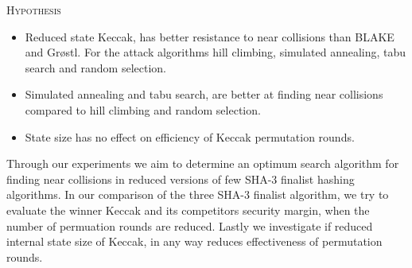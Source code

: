 \begin{center}
  \framebox
  {
    \parbox{400pt}
    {
      \centering \textsc{Hypothesis} \\
      \begin{itemize}
      \item Reduced state Keccak, has better resistance to near collisions than BLAKE and Gr{\o}stl. For the
      attack algorithms hill climbing, simulated annealing, tabu search and random selection.
      \item Simulated annealing and tabu search, are better at finding near collisions compared to hill 
      climbing and random selection.
      \item State size has no effect on efficiency of Keccak permutation rounds.
      \end{itemize}
    }
  }
\end{center}

Through our experiments we aim to determine an optimum search algorithm for finding near collisions
in reduced versions of few SHA-3 finalist hashing algorithms. In our comparison of
the three SHA-3 finalist algorithm, we try to evaluate the winner Keccak and its competitors security margin, when
the number of permuation rounds are reduced. Lastly we investigate if reduced internal state size of Keccak,
in any way reduces effectiveness of permutation rounds.
